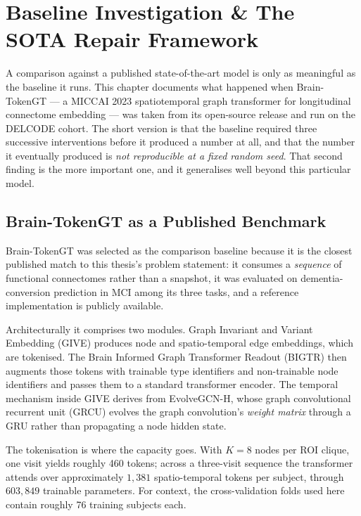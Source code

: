 \chapter{Baseline Investigation \& The SOTA Repair Framework}
\label{ch:sota-repair}

A comparison against a published state-of-the-art model is only as meaningful as the
baseline it runs. This chapter documents what happened when Brain-TokenGT --- a MICCAI 2023
spatiotemporal graph transformer for longitudinal connectome embedding --- was taken from
its open-source release and run on the DELCODE cohort. The short version is that the
baseline required three successive interventions before it produced a number at all, and
that the number it eventually produced is \emph{not reproducible at a fixed random seed}.
That second finding is the more important one, and it generalises well beyond this
particular model.

\section{Brain-TokenGT as a Published Benchmark}
\label{sec:btgt-what}

Brain-TokenGT was selected as the comparison baseline because it is the closest published
match to this thesis's problem statement: it consumes a \emph{sequence} of functional
connectomes rather than a snapshot, it was evaluated on dementia-conversion prediction in
MCI among its three tasks, and a reference implementation is publicly available.

Architecturally it comprises two modules. Graph Invariant and Variant Embedding (GIVE)
produces node and spatio-temporal edge embeddings, which are tokenised. The Brain Informed
Graph Transformer Readout (BIGTR) then augments those tokens with trainable type
identifiers and non-trainable node identifiers and passes them to a standard transformer
encoder. The temporal mechanism inside GIVE derives from EvolveGCN-H, whose graph
convolutional recurrent unit (GRCU) evolves the graph convolution's \emph{weight matrix}
through a GRU rather than propagating a node hidden state.

The tokenisation is where the capacity goes. With $K = 8$ nodes per ROI clique, one visit
yields roughly 460 tokens; across a three-visit sequence the transformer attends over
approximately $1{,}381$ spatio-temporal tokens per subject, through $603{,}849$ trainable
parameters. For context, the cross-validation folds used here contain roughly 76 training
subjects each.

